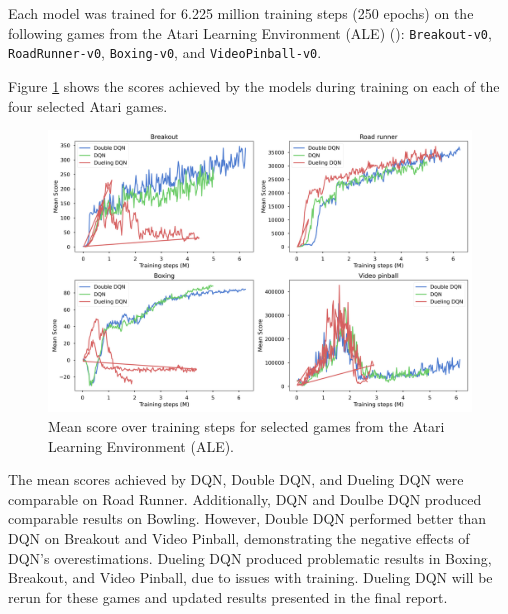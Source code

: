 \documentclass{article}
\begin{document}
Each model was trained for 6.225 million training steps (250 epochs) on the
following games from the Atari Learning Environment (ALE)
(\cite{bellemare2013arcade}): \texttt{Breakout-v0}, \texttt{RoadRunner-v0},
\texttt{Boxing-v0}, and \texttt{VideoPinball-v0}.

Figure \ref{fig:training} shows the scores achieved by the models during
training on each of the four selected Atari games.

\begin{figure}[ht]
    \centering
    \includegraphics[width=\linewidth]{double_dqn-mean_scores.png}
    \caption{Mean score over training steps for selected games from the Atari
    Learning Environment (ALE).}
    \label{fig:training}
\end{figure}

The mean scores achieved by DQN, Double DQN, and Dueling DQN were comparable on Road Runner. 
Additionally, DQN and Doulbe DQN produced comparable results on Bowling. However, Double DQN 
performed better than DQN on Breakout and Video Pinball, demonstrating the negative effects 
of DQN's overestimations. Dueling DQN produced problematic results in Boxing, Breakout, and
Video Pinball, due to issues with training. Dueling DQN will be rerun for these games and
updated results presented in the final report.


\end{document}
